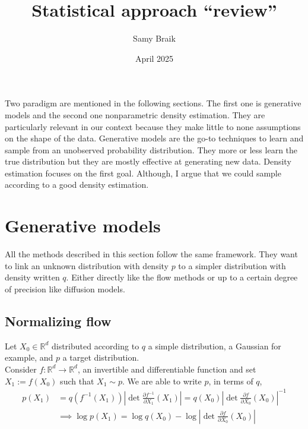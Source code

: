 \documentclass{article}
\title{Statistical approach ``review''}
\author{Samy Braik}
\date{April 2025}
\begin{document}
\maketitle

Two paradigm are mentioned in the following sections. The first one is generative models and the second one nonparametric density estimation. They are particularly relevant in our context because they make little to none assumptions on the shape of the data.
Generative models are the go-to techniques to learn and sample from an unobserved probability distribution. They more or less learn the true distribution but they are mostly effective at generating new data. Density estimation focuses on the first goal. Although, I argue that we could sample according to a good density estimation.

\section{Generative models}
All the methods described in this section follow the same framework. They want to link an unknown distribution with density \(p\) to a simpler distribution with density written \(q\). Either directly like the flow methods or up to a certain degree of precision like diffusion models.
\subsection{Normalizing flow}
Let \(X_0\in\mathbb{R}^d\) distributed according to \(q\) a simple distribution, a Gaussian for example, and \(p\) a target distribution.
\\
Consider \(f:\mathbb{R}^d\rightarrow\mathbb{R}^d\), an invertible and differentiable function and set \(X_1:=f(X_0)\) such that \(X_1\sim p\). 
We are able to write \(p\), in terms of \(q\), 
\begin{align}
    p(X_1)&=q(f^{-1}(X_1))\left| \det\frac{\partial f^{-1}}{\partial X_1}(X_1) \right| = q(X_0)\left| \det \frac{\partial f}{\partial X_0}(X_0) \right|^{-1} \\
    &\implies \log p(X_1)=\log q(X_0) - \log \left|  \det \frac{\partial f}{\partial X_0}(X_0) \right|  
\end{align}
\end{document}

